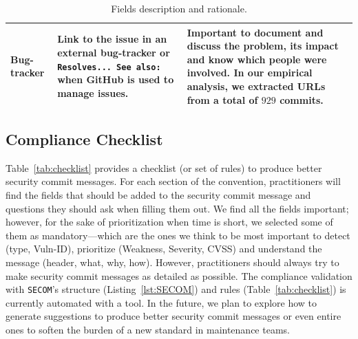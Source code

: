 \begin{table}
\begin{tabular}{ | p{1.75cm} | p{4cm} | p{11cm} | }
         Bug-tracker & Link to the issue in an external bug-tracker or \texttt{Resolves... See also:} when GitHub is used to manage issues. & Important to document and discuss the problem, its impact and know which people were involved. In our empirical analysis, we extracted URLs from a total of $929$ commits. \\  
    \hline
    \end{tabular}
    \caption{Fields description and rationale.}
    \label{tab:fields}
\end{table}




\subsection{Compliance Checklist}

Table~\ref{tab:checklist} provides a checklist (or set of rules) to produce better security commit messages.
For each section of the convention, practitioners will find the fields that should be added to the 
security commit message and questions they should ask when filling them out. We find all the fields important; however, for the sake of prioritization when time is short, we selected some of them as mandatory---which are the ones we think to be most important to detect (type, Vuln-ID), prioritize (Weakness, Severity, CVSS) and understand the message (header, what, why, how). However, practitioners should always try to make security commit messages as detailed as possible. The compliance validation with \texttt{SECOM}'s structure (Listing~\ref{lst:SECOM}) and rules (Table~\ref{tab:checklist}) is currently automated with a tool. In the future, we plan to explore how to generate suggestions to produce better security commit messages or even entire ones to soften the burden of a new standard in maintenance teams.



